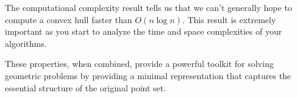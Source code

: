 \begin{mathinsight}
The computational complexity result tells us that we can't generally hope to compute a convex hull faster than $O(n \log n)$. This result is extremely important as you start to analyze the time and space complexities of your algorithms.
\end{mathinsight}

These properties, when combined, provide a powerful toolkit for solving geometric problems by providing a minimal representation that captures the essential structure of the original point set.
\label{intro:D}
